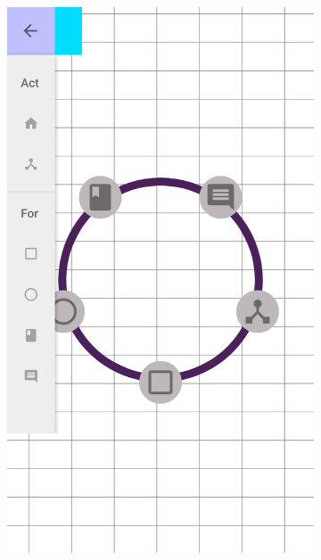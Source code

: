 \begin{itemize}
		\vspace*{\fill}
		\begin{figure}[!h]
			\centering
			\begin{subfigure}[t]{.3\textwidth}
				\includegraphics[width=\textwidth]{img/screen/colladia_draw_view_menu_main}
			\end{subfigure}
			~
			\begin{subfigure}[t]{.3\textwidth}

\end{subfigure}
\end{figure}
\end{itemize}

